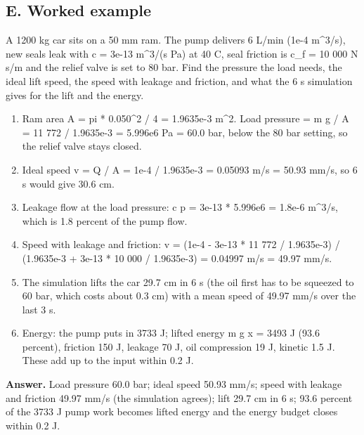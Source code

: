 \documentclass[11pt,a4paper]{article}
\begin{document}
\subsection*{E. Worked example}
A 1200 kg car sits on a 50 mm ram. The pump delivers 6 L/min (1e-4 m\textasciicircum{}3/s), new seals leak with c = 3e-13 m\textasciicircum{}3/(s Pa) at 40 C, seal friction is c\_f = 10 000 N s/m and the relief valve is set to 80 bar. Find the pressure the load needs, the ideal lift speed, the speed with leakage and friction, and what the 6 s simulation gives for the lift and the energy.
\begin{enumerate}[nosep]
\item Ram area A = pi * 0.050\textasciicircum{}2 / 4 = 1.9635e-3 m\textasciicircum{}2. Load pressure = m g / A = 11 772 / 1.9635e-3 = 5.996e6 Pa = 60.0 bar, below the 80 bar setting, so the relief valve stays closed.
\item Ideal speed v = Q / A = 1e-4 / 1.9635e-3 = 0.05093 m/s = 50.93 mm/s, so 6 s would give 30.6 cm.
\item Leakage flow at the load pressure: c p = 3e-13 * 5.996e6 = 1.8e-6 m\textasciicircum{}3/s, which is 1.8 percent of the pump flow.
\item Speed with leakage and friction: v = (1e-4 - 3e-13 * 11 772 / 1.9635e-3) / (1.9635e-3 + 3e-13 * 10 000 / 1.9635e-3) = 0.04997 m/s = 49.97 mm/s.
\item The simulation lifts the car 29.7 cm in 6 s (the oil first has to be squeezed to 60 bar, which costs about 0.3 cm) with a mean speed of 49.97 mm/s over the last 3 s.
\item Energy: the pump puts in 3733 J; lifted energy m g x = 3493 J (93.6 percent), friction 150 J, leakage 70 J, oil compression 19 J, kinetic 1.5 J. These add up to the input within 0.2 J.
\end{enumerate}
\textbf{Answer.} Load pressure 60.0 bar; ideal speed 50.93 mm/s; speed with leakage and friction 49.97 mm/s (the simulation agrees); lift 29.7 cm in 6 s; 93.6 percent of the 3733 J pump work becomes lifted energy and the energy budget closes within 0.2 J.
\end{document}
